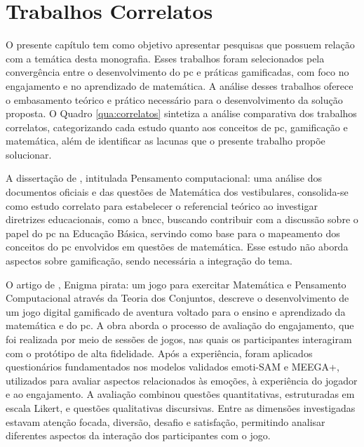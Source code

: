 
\setlength{\parskip}{0.3cm}

\chapter{Trabalhos Correlatos}
\label{ch:trabalhos_correlatos}
O presente capítulo tem como objetivo apresentar pesquisas que possuem relação
com a temática desta monografia. Esses trabalhos foram selecionados pela
convergência entre o desenvolvimento do \gls{pc} e práticas gamificadas, com foco
no engajamento e no aprendizado de matemática. A análise desses trabalhos
oferece o embasamento teórico e prático necessário para o desenvolvimento da
solução proposta. O Quadro \ref{qua:correlatos} sintetiza a análise comparativa
dos trabalhos correlatos, categorizando cada estudo quanto aos conceitos de
\gls{pc}, gamificação e matemática, além de identificar as lacunas que o
presente trabalho propõe solucionar.

 
A dissertação de , intitulada Pensamento computacional:
uma análise dos documentos oficiais e das questões de Matemática dos
vestibulares, consolida-se como estudo correlato para estabelecer o referencial
teórico ao investigar diretrizes educacionais, como a \gls{bncc}, buscando contribuir
com a discussão sobre o papel do \gls{pc} na Educação
Básica, servindo como base para o mapeamento dos conceitos do \gls{pc} envolvidos em questões
de matemática. Esse estudo não aborda aspectos sobre gamificação, sendo necessária 
a integração do tema.
  
O artigo de , Enigma pirata: um jogo para exercitar Matemática e
Pensamento Computacional através da Teoria dos Conjuntos, descreve o
desenvolvimento de um jogo digital gamificado de aventura voltado para o ensino
e aprendizado da matemática e do \gls{pc}. A obra aborda o
processo de avaliação do engajamento, que foi realizada por meio
de sessões de jogos, nas quais os participantes interagiram com o protótipo de alta fidelidade.
Após a experiência, foram aplicados questionários fundamentados nos modelos validados emoti-SAM e MEEGA+, utilizados para avaliar aspectos relacionados às emoções, à experiência do jogador e ao engajamento. A avaliação combinou questões quantitativas, estruturadas em escala Likert, e questões qualitativas discursivas.
Entre as dimensões investigadas estavam atenção focada, diversão, desafio e satisfação, permitindo analisar diferentes aspectos da interação dos participantes com o jogo.

